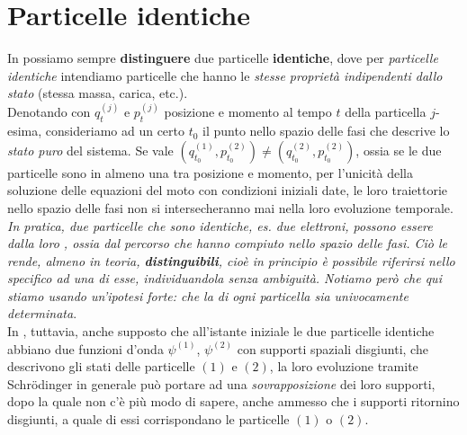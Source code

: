 \documentclass[../../FisicaTeorica.tex]{subfiles}
\begin{document}

\section{Particelle identiche}
In \MC possiamo sempre \textbf{distinguere} due particelle \textbf{identiche}, dove per \textit{particelle identiche} intendiamo particelle che hanno le \textit{stesse proprietà indipendenti dallo stato} (stessa massa, carica, etc.).\\
Denotando con $q_t^{(j)}$ e $p_t^{(j)}$ posizione e momento al tempo $t$ della particella $j$-esima, consideriamo ad un certo $t_0$ il punto nello spazio delle fasi che descrive lo \textit{stato puro} del sistema. Se vale $(q_{t_0}^{(1)}, p_{t_0}^{(2)}) \neq (q_{t_0}^{(2)},p_{t_0}^{(2)})$, ossia se le due particelle sono  in almeno una tra posizione e momento, per l'unicità della soluzione delle equazioni del moto con condizioni iniziali date, le loro traiettorie nello spazio delle fasi non si intersecheranno mai nella loro evoluzione temporale.\\
\textit{In pratica, due particelle che sono identiche, es. due elettroni, possono essere  dalla loro , ossia dal percorso che hanno compiuto nello spazio delle fasi. Ciò le rende, almeno in teoria, \textbf{distinguibili}, cioè in principio è possibile riferirsi nello specifico ad una di esse, individuandola senza ambiguità. Notiamo però che qui stiamo usando un'ipotesi forte: che la  di ogni particella sia univocamente determinata}.\\
In \MQ, tuttavia, anche supposto che all'istante iniziale le due particelle identiche abbiano due funzioni d'onda $\psi^{(1)}$, $\psi^{(2)}$ con supporti spaziali disgiunti, che descrivono gli stati delle particelle $(1)$ e $(2)$, la loro evoluzione tramite Schr\"odinger in generale può portare ad una \textit{sovrapposizione} dei loro supporti, dopo la quale non c'è più modo di sapere, anche ammesso che i supporti ritornino disgiunti, a quale di essi corrispondano le particelle $(1)$ o $(2)$.
\end{document}
